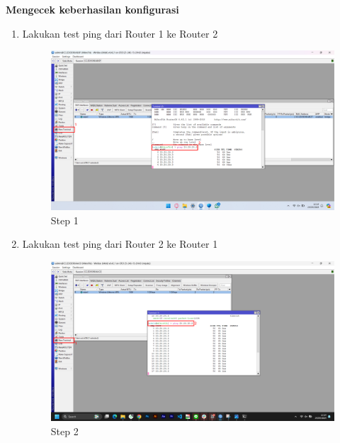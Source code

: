 \begin{center}
	\textbf{Mengecek keberhasilan konfigurasi}
	\begin{enumerate}
		\item Lakukan test ping dari Router 1 ke Router 2
		\begin{figure}[H]
			\centering
			\includegraphics[width=0.9\linewidth]{P1/img/per1/pc1/Step 4.png}
			\caption{Step 1}
			\label{fig:Ping Step 1(Per.1 PC1)}
		\end{figure}
		\item Lakukan test ping dari Router 2 ke Router 1
		\begin{figure}[H]
			\centering
			\includegraphics[width=0.9\linewidth]{P1/img/per1/pc2/Step 4.png}
			\caption{Step 2}
			\label{fig:Ping Step 2(Per.1 PC2)}
		\end{figure}
	\end{enumerate}
\end{center}

